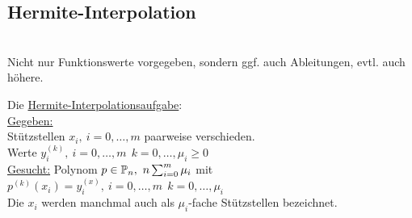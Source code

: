 \documentclass[../Skript.tex]{subfiles}
\begin{document}
\subsection{Hermite-Interpolation}\hfill\\
Nicht nur Funktionswerte vorgegeben, sondern ggf. auch Ableitungen, evtl. auch höhere.
\begin{definition}
    Die \underline{Hermite-Interpolationsaufgabe}:\\
    \underline{Gegeben:}\\ Stützstellen $x_i, \ i=0,\dots , m$ paarweise verschieden.\\
           \qquad Werte $y_i^{(k)}, \ i=0,\dots , m\ \ k=0,\dots, \mu_i \geq 0$\\
            
    \underline{Gesucht:} Polynom $p\in\bbP_n,\ n\sum_{i=0}^{m}\mu_i$ mit $p^{(k)}(x_i)=y_i^{(x)},\ i=0,\dots,m \ \ 
    k=0,\dots,\mu_i$\\
    Die $x_i$ werden manchmal auch als $\mu_i$-fache Stützstellen bezeichnet.
\end{definition}
\end{document}
